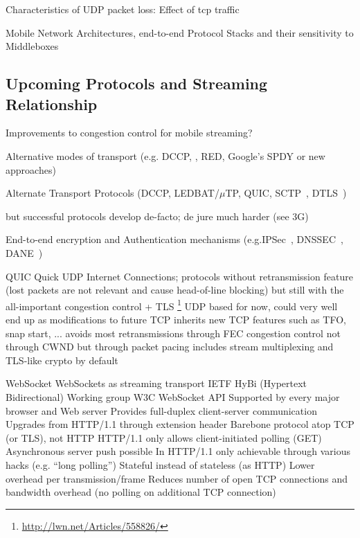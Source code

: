 Characteristics of UDP packet loss: Effect of tcp traffic \cite{sawashima97characteristics}


Mobile Network Architectures, end-to-end Protocol Stacks and their sensitivity to Middleboxes



\subsection{Upcoming Protocols and Streaming Relationship}

Improvements to congestion control for mobile streaming?


 Alternative modes of transport (e.g. DCCP, , RED, Google's SPDY or new approaches)

 Alternate Transport Protocols (DCCP\cite{rfc4340}, LEDBAT\cite{rfc6817}/$\mu$TP\cite{bt2010utp}, QUIC, SCTP~\cite{rfc4960}, DTLS~\cite{rfc6347})

but successful protocols develop de-facto; de jure much harder (see \gls{3G})



 End-to-end encryption and Authentication mechanisms (e.g.IPSec~\cite{rfc4301}, DNSSEC~\cite{rfc4033}, \gls{DANE}~\cite{rfc6698})


\gls{QUIC}  Quick UDP Internet Connections; protocols without retransmission feature (lost packets are not relevant and cause head-of-line blocking) but still with the all-important congestion control + TLS
\footnote{\url{http://lwn.net/Articles/558826/}}
UDP based for now, could very well end up as modifications to future TCP
inherits new TCP features such as TFO, snap start, ...
avoids most retransmissions through FEC
congestion control not through CWND but through packet pacing
includes stream multiplexing and TLS-like crypto by default



WebSocket \cite{rfc6455}
WebSockets as streaming transport \cite{w3c2011websockets} \cite{heise2011websockets}
 IETF HyBi (Hypertext Bidirectional) Working group
 W3C WebSocket API
 Supported by every major browser and Web server
 Provides full-duplex client-server communication
	Upgrades from HTTP/1.1 through extension header
	Barebone protocol atop TCP (or TLS), not HTTP
	HTTP/1.1 only allows client-initiated polling (GET)
	Asynchronous server push possible
		In HTTP/1.1 only achievable through various hacks (e.g. ``long polling'')
		Stateful instead of stateless (as HTTP)
Lower overhead per transmission/frame
Reduces number of open TCP connections and bandwidth overhead (no polling on additional TCP connection)


